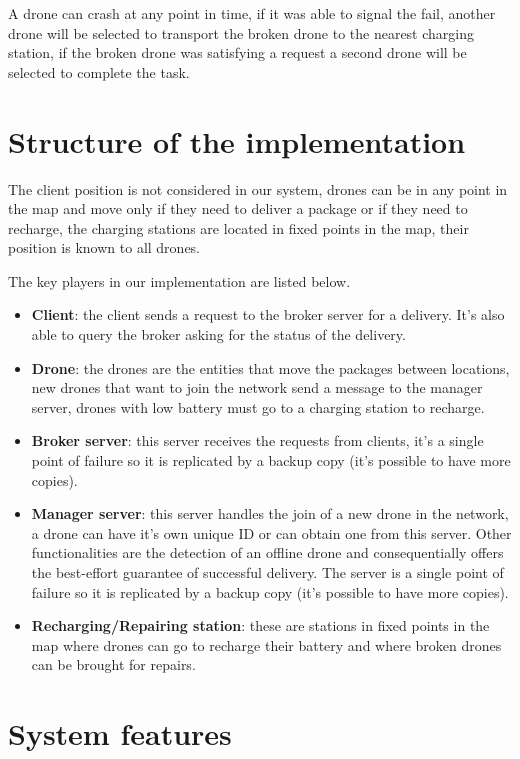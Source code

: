 \documentclass[a4paper, oneside]{memoir}
\begin{document}
A drone can crash at any point in time, if it was able to signal the fail, another drone will be selected to transport the broken drone to the nearest charging station, if the broken drone was satisfying a request a second drone will be selected to complete the task.


\section{Structure of the implementation}

The client position is not considered in our system, drones can be in any point in the map and move only if they need to deliver a package or if they need to recharge, the charging stations are located in fixed points in the map, their position is known to all drones.

The key players in our implementation are listed below.
\begin{itemize}
\item \textbf{Client}: the client sends a request to the broker server for a delivery. It's also able to query the broker asking for the status of the delivery.
\item \textbf{Drone}: the drones are the entities that move the packages between locations, new drones that want to join the network send a message to the manager server, drones with low battery must go to a charging station to recharge.
\item \textbf{Broker server}: this server receives the requests from clients, it's a single point of failure so it is replicated by a backup copy (it's possible to have more copies).
\item \textbf{Manager server}: this server handles the join of a new drone in the network, a drone can have it's own unique ID or can obtain one from this server. Other functionalities are the detection of an offline drone and consequentially offers the best-effort guarantee of successful delivery. The server is a single point of failure so it is replicated by a backup copy (it's possible to have more copies).
\item \textbf{Recharging/Repairing station}: these are stations in fixed points in the map where drones can go to recharge their battery and where broken drones can be brought for repairs.
\end{itemize}


\section{System features}
\label{System-features}
\end{document}
